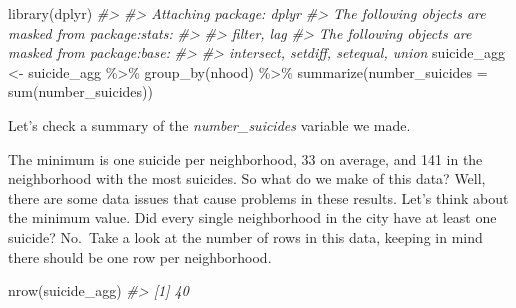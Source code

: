 \documentclass[
]{krantz}
\makeatletter
\newenvironment{Shaded}{\begin{snugshade}}{\end{snugshade}}
\newcommand{\AttributeTok}[1]{\textcolor[rgb]{0.61,0.61,0.61}{#1}}
\newcommand{\CommentTok}[1]{\textcolor[rgb]{0.37,0.37,0.37}{\textit{#1}}}
\newcommand{\FunctionTok}[1]{\textcolor[rgb]{0,0,0}{#1}}
\newcommand{\NormalTok}[1]{#1}
\newcommand{\OtherTok}[1]{\textcolor[rgb]{0.37,0.37,0.37}{#1}}
\newcommand{\SpecialCharTok}[1]{\textcolor[rgb]{0,0,0}{#1}}
\newenvironment{kframe}{%
\medskip{}
\setlength{\fboxsep}{.8em}
 \def\at@end@of@kframe{}%
 \ifinner\ifhmode%
  \def\at@end@of@kframe{\end{minipage}}%
  \begin{minipage}{\columnwidth}%
 \fi\fi%
 \def\FrameCommand##1{\hskip\@totalleftmargin \hskip-\fboxsep
 \colorbox{shadecolor}{##1}\hskip-\fboxsep
     \hskip-\linewidth \hskip-\@totalleftmargin \hskip\columnwidth}%
 \MakeFramed {\advance\hsize-\width
   \@totalleftmargin\z@ \linewidth\hsize
   \@setminipage}}%
 {\par\unskip\endMakeFramed%
 \at@end@of@kframe}
\renewenvironment{Shaded}{\begin{kframe}}{\end{kframe}}
\makeatother
\begin{document}
\begin{Shaded}
\begin{Highlighting}[]
\FunctionTok{library}\NormalTok{(dplyr)}
\CommentTok{\#\textgreater{} }
\CommentTok{\#\textgreater{} Attaching package: \textquotesingle{}dplyr\textquotesingle{}}
\CommentTok{\#\textgreater{} The following objects are masked from \textquotesingle{}package:stats\textquotesingle{}:}
\CommentTok{\#\textgreater{} }
\CommentTok{\#\textgreater{}     filter, lag}
\CommentTok{\#\textgreater{} The following objects are masked from \textquotesingle{}package:base\textquotesingle{}:}
\CommentTok{\#\textgreater{} }
\CommentTok{\#\textgreater{}     intersect, setdiff, setequal, union}
\NormalTok{suicide\_agg }\OtherTok{\textless{}{-}}\NormalTok{ suicide\_agg }\SpecialCharTok{\%\textgreater{}\%} \FunctionTok{group\_by}\NormalTok{(nhood) }\SpecialCharTok{\%\textgreater{}\%} \FunctionTok{summarize}\NormalTok{(}\AttributeTok{number\_suicides =} \FunctionTok{sum}\NormalTok{(number\_suicides))}
\end{Highlighting}
\end{Shaded}

Let's check a summary of the \emph{number\_suicides} variable we made.

\begin{Shaded}
\end{Shaded}

The minimum is one suicide per neighborhood, 33 on average, and 141 in the neighborhood with the most suicides. So what do we make of this data? Well, there are some data issues that cause problems in these results. Let's think about the minimum value. Did every single neighborhood in the city have at least one suicide? No.~Take a look at the number of rows in this data, keeping in mind there should be one row per neighborhood.

\begin{Shaded}
\begin{Highlighting}[]
\FunctionTok{nrow}\NormalTok{(suicide\_agg)}
\CommentTok{\#\textgreater{} [1] 40}
\end{Highlighting}
\end{Shaded}
\end{document}
